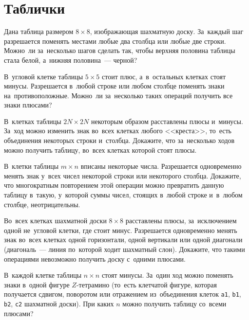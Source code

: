 
\section*{Таблички}


\begin{problems}

Дана таблица размером $8 \times 8$, изображающая шахматную доску.
За~каждый шаг разрешается поменять местами любые два столбца или любые две
строки.
Можно~ли за~нес\-колько шагов сделать так, чтобы верхняя половина таблицы стала
белой, а~нижняя половина~--- черной?

В~угловой клетке таблицы $5 \times 5$ стоит плюс, а~в~остальных клетках стоят
минусы.
Разрешается в~любой строке или любом столбце поменять знаки на~противоположные.
Можно~ли за~несколько таких операций получить все знаки плюсами?

\item
В~клетках таблицы $2 N \times 2 N$ некоторым образом расставлены плюсы
и~минусы.
За~ход можно изменить знак во~всех клетках любого <<креста>>, то~есть
объединения некоторых строки и~столбца.
Докажите, что за~несколько ходов можно получить таблицу, во~всех клетках
которой стоят плюсы.

\item
В~клетки таблицы $m \times n$ вписаны некоторые числа.
Разрешается одновременно менять знак у~всех чисел некоторой строки или
некоторого столбца.
Докажите, что многократным повторением этой операции можно превратить данную
таблицу в~такую, у~которой суммы чисел, стоящих в~любой строке и~в~любом
столбце, неотрицательны.

\item
Во~всех клетках шахматной доски $8 \times 8$ расставлены плюсы, за~исключением
одной не~угловой клетки, где стоит минус.
Разрешается одновременно менять знак во~всех клетках одной горизонтали, одной
вертикали или одной диагонали
(диагональ~--- линия по~которой ходит шахматный слон).
Докажите, что такими операциями невозможно получить доску с~одними плюсами.

\item
В~каждой клетке таблицы $n \times n$ стоят минусы.
За~один ход можно поменять знаки в~одной фигуре $Z$-тетрамино
(то~есть клетчатой фигуре, которая получается сдвигом, поворотом или отражением
из~объединения клеток \texttt{a1}, \texttt{b1}, \texttt{b2}, \texttt{c2}
шахматной доски).
При каких $n$ можно получить таблицу со~всеми плюсами?


\end{problems}
